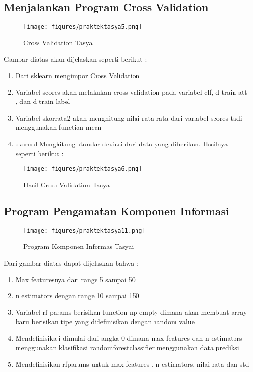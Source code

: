\subsection{ Menjalankan Program Cross Validation}
\begin{figure}[ht]
\centering
\texttt{[image: figures/praktektasya5.png]}
\caption{Cross Validation Tasya}
\label{Aplikasi Pandas}
\end{figure}
Gambar diatas akan dijelaskan seperti berikut :
\begin{enumerate}
\item Dari sklearn mengimpor Cross Validation
\item Variabel scores akan melakukan cross validation pada variabel clf, d train att , dan d train label
\item Variabel skorrata2 akan menghitung nilai rata rata dari variabel scores tadi menggunakan function mean
\item skoresd Menghitung standar deviasi dari data yang diberikan. Hssilnya seperti berikut :
\end{enumerate}
\begin{figure}[ht]
\centering
\texttt{[image: figures/praktektasya6.png]}
\caption{Hasil Cross Validation Tasya}
\label{Cross Validation}
\end{figure}

\subsection{Program Pengamatan Komponen Informasi}
\begin{figure}[ht]
\centering
\texttt{[image: figures/praktektasya11.png]}
\caption{Program Komponen Informas Tasyai}
\label{Praktek}
\end{figure}
Dari gambar diatas dapat dijelaskan bahwa :
\begin{enumerate}
\item Max featuresnya dari range 5 sampai 50
\item n estimators dengan range 10 sampai 150
\item Variabel rf params berisikan function np empty dimana akan membuat array baru berisikan tipe yang didefinisikan dengan random value
\item Mendefinisika i dimulai dari angka 0 dimana max features dan n estimators menggunakan klasifikasi randomforestclassifier menggunakan data prediksi
\item Mendefinisikan rfparams untuk max features , n estimators, nilai rata dan std
\end{enumerate}

